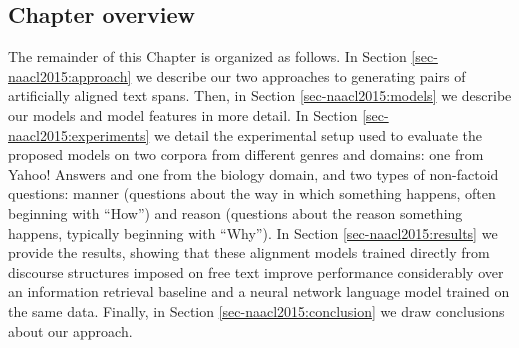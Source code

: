 \subsection{Chapter overview}

The remainder of this Chapter is organized as follows.  In Section \ref{sec-naacl2015:approach} we describe our two approaches to generating pairs of artificially aligned text spans.  Then, in Section \ref{sec-naacl2015:models} we describe our models and model features in more detail.  In Section \ref{sec-naacl2015:experiments} we detail the experimental setup used to evaluate the proposed models on two corpora from different genres and domains: one from Yahoo! Answers and one from the biology domain, and two types of non-factoid questions: manner (questions about the way in which something happens, often beginning with ``How'') and reason (questions about the reason something happens, typically beginning with ``Why'').  In Section \ref{sec-naacl2015:results} we provide the results, showing that these alignment models trained directly from discourse structures imposed on free text
improve performance considerably over an information retrieval baseline and a neural network language model trained on the same data.  Finally, in Section \ref{sec-naacl2015:conclusion} we draw conclusions about our approach.

%
%
%
%
%


